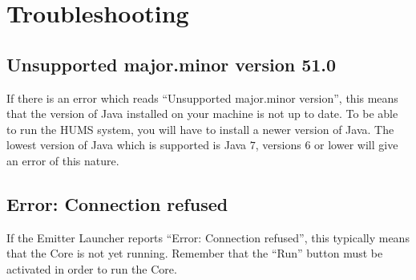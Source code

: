 \documentclass[10pt,a4paper]{article}
\begin{document}
\section{Troubleshooting}

\subsection{Unsupported major.minor version 51.0}

If there is an error which reads ``Unsupported major.minor version'', this means that the version of Java installed on your machine is not up to date. To be able to run the HUMS system, you will have to install a newer version of Java. The lowest version of Java which is supported is Java $7$, versions $6$ or lower will give an error of this nature.

\subsection{Error: Connection refused}

If the Emitter Launcher reports ``Error: Connection refused'', this typically means that the Core is not yet running. Remember that the ``Run'' button must be activated in order to run the Core.
\end{document}
